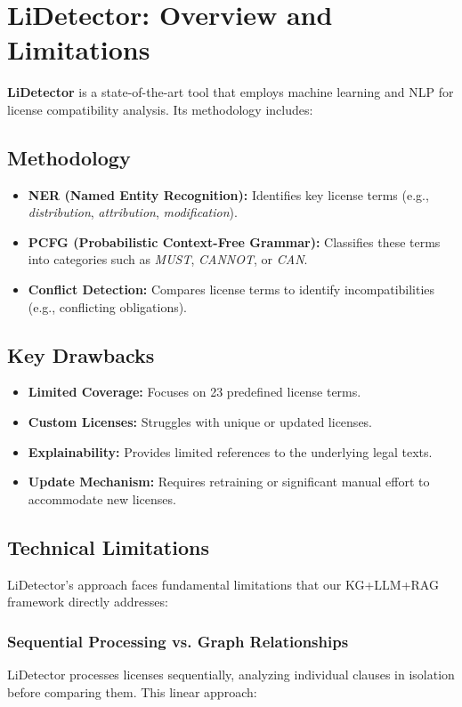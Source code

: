 \documentclass[12pt]{article}
\begin{document}
\section{LiDetector: Overview and Limitations}
\label{sec:lidetector}
\textbf{LiDetector} is a state-of-the-art tool that employs machine learning and NLP for license compatibility analysis. Its methodology includes:

\subsection{Methodology}
\begin{itemize}
    \item \textbf{NER (Named Entity Recognition):} Identifies key license terms (e.g., \emph{distribution}, \emph{attribution}, \emph{modification}).
    \item \textbf{PCFG (Probabilistic Context-Free Grammar):} Classifies these terms into categories such as \emph{MUST}, \emph{CANNOT}, or \emph{CAN}.
    \item \textbf{Conflict Detection:} Compares license terms to identify incompatibilities (e.g., conflicting obligations).
\end{itemize}

\subsection{Key Drawbacks}
\begin{itemize}
    \item \textbf{Limited Coverage:} Focuses on 23 predefined license terms.
    \item \textbf{Custom Licenses:} Struggles with unique or updated licenses.
    \item \textbf{Explainability:} Provides limited references to the underlying legal texts.
    \item \textbf{Update Mechanism:} Requires retraining or significant manual effort to accommodate new licenses.
\end{itemize}

\subsection{Technical Limitations}
LiDetector's approach faces fundamental limitations that our KG+LLM+RAG framework directly addresses:

\subsubsection{Sequential Processing vs. Graph Relationships}
LiDetector processes licenses sequentially, analyzing individual clauses in isolation before comparing them. This linear approach:
\end{document}
